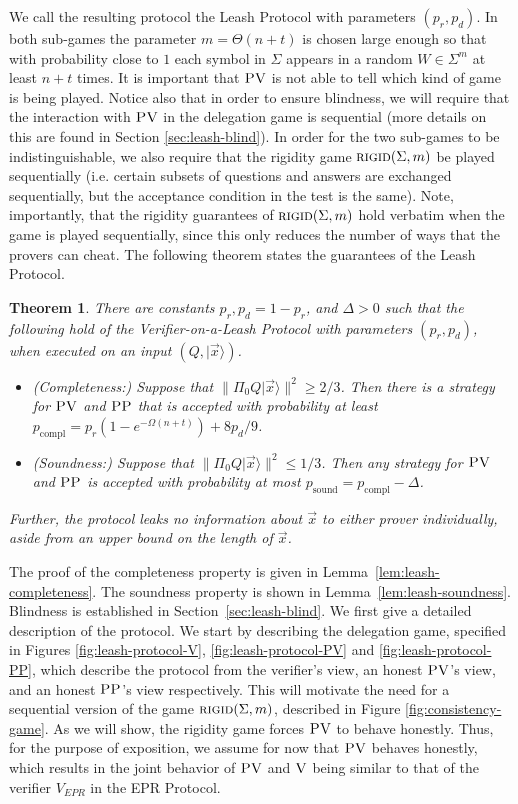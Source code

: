 \documentclass[11pt]{article}
\newtheorem{theorem}{Theorem}
\newcommand{\ket}[1]{|#1\rangle}
\newcommand{\rigid}{\textsc{rigid}}
\newcommand{\ver}{\textsc{V}}
\newcommand{\pv}{\textsc{PV}}
\newcommand{\pp}{\textsc{PP}}
\begin{document}
We call the resulting protocol the Leash Protocol with parameters $(p_r,p_d)$. In both sub-games the parameter $m=\Theta(n+t)$ is chosen large enough so that with probability close to $1$ each symbol in $\Sigma$ appears in a random $W\in \Sigma^m$ at least $n+t$ times. It is important that $\pv$ is not able to tell which kind of game is being played. Notice also that in order to ensure blindness, we will require that the interaction with $\pv$ in the delegation game is sequential (more details on this are found in Section \ref{sec:leash-blind}). In order for the two sub-games to be indistinguishable, we also require that the rigidity game $\rigid(\Sigma,m)$ be played sequentially (i.e. certain subsets of questions and answers are exchanged sequentially, but the acceptance condition in the test is the same). Note, importantly, that the rigidity guarantees of $\rigid(\Sigma,m)$ hold verbatim when the game is played sequentially, since this only reduces the number of ways that the provers can cheat. The following theorem states the guarantees of the Leash Protocol.

\begin{theorem}\label{thm:leash}
There are constants $p_r,p_d=1-p_r$, and $\Delta>0$ such that the following hold of the Verifier-on-a-Leash Protocol with parameters $(p_r,p_d)$, when executed on an input $(Q,\ket{\vec{x}})$.
\begin{itemize}
\item \emph{(Completeness:)} Suppose that $\|\Pi_0 Q\ket{\vec{x}}\|^2 \geq 2/3$. Then there is a strategy for $\pv$ and $\pp$ that is accepted with probability at least $p_{\mathrm{compl}} = p_r(1-e^{-\Omega(n+t)})+8p_d/9$. 
\item \emph{(Soundness:)} Suppose that $\|\Pi_0 Q\ket{\vec{x}}\|^2 \leq 1/3$. Then any strategy for $\pv$ and $\pp$ is accepted with probability at most $p_{\mathrm{sound}} = p_{\mathrm{compl}} - \Delta$. 
\end{itemize}
Further, the protocol leaks no information about $\vec{x}$ to either prover individually, aside from an upper bound on the length of $\vec{x}$. 
\end{theorem}



The proof of the completeness property is given in Lemma~\ref{lem:leash-completeness}. The soundness property is shown in Lemma~\ref{lem:leash-soundness}. Blindness is established in Section~\ref{sec:leash-blind}. 
We first give a detailed description of the protocol. We start by describing the delegation game, specified in Figures \ref{fig:leash-protocol-V}, \ref{fig:leash-protocol-PV} and \ref{fig:leash-protocol-PP}, which describe the protocol from the verifier's view, an honest $\pv$'s view, and an honest $\pp$'s view respectively. This will motivate the need for a sequential version of the game $\rigid(\Sigma,m)$, described in Figure \ref{fig:consistency-game}. As we will show, the rigidity game forces $\pv$ to behave honestly. Thus, for the purpose of exposition, we assume for now that $\pv$ behaves honestly, which results in the joint behavior of $\pv$ and $\ver$ being similar to that of the verifier $V_{EPR}$ in the EPR Protocol. 
\end{document}
